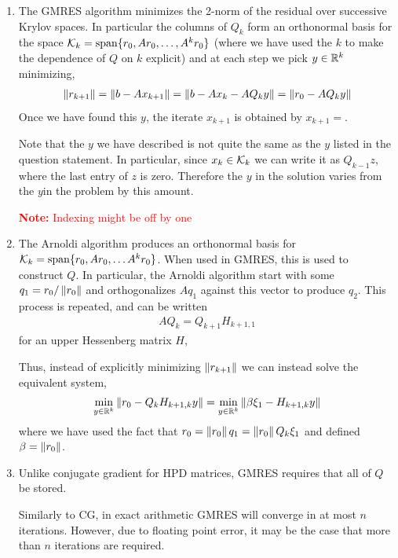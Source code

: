 \documentclass[10pt]{article}
\newcommand{\note}[1]{\textcolor{red}{\textbf{Note:} #1}}
\begin{document}
\begin{solution}[Solution]
\begin{enumerate}[]
\item The GMRES algorithm minimizes the 2-norm of the residual over successive Krylov spaces. In particular the columns of \( Q_k \) form an orthonormal basis for the space \( \mathcal{K}_k= \operatorname{span}\{r_0, Ar_0, \ldots, A^{k} r_0\} \) (where we have used the \( k \) to make the dependence of \( Q \) on \( k \) explicit) and at each step we pick \( y\in\mathbb{R}^k \) minimizing,
\begin{align*}
    \left\lVert r_{k+1}\right\rVert = \left\lVert b-Ax_{k+1}\right\rVert = \left\lVert b-Ax_k-AQ_ky\right\rVert = \left\lVert r_0-AQ_ky\right\rVert
\end{align*}
Once we have found this \( y \), the iterate \( x_{k+1} \) is obtained by \( x_{k+1} =  \).

Note that the \( y \) we have described is not quite the same as the \( y \) listed in the question statement. In particular, since \( x_{k}\in\mathcal{K}_k \) we can write it as \( Q_{k-1} z \), where the last entry of \( z \) is zero. Therefore the \( y \) in the solution varies from the \( y \)in the problem by this amount.

\note{Indexing might be off by one}

\item The Arnoldi algorithm produces an orthonormal basis for \( \mathcal{K}_k = \operatorname{span}\{r_0, Ar_0, \ldots A^k r_0\} \). When used in GMRES, this is used to construct \( Q \). In particular, the Arnoldi algorithm start with some \( q_1 = r_0 / \left\lVert r_0\right\rVert \) and orthogonalizes \( Aq_1 \) against this vector to produce \( q_2 \). This process is repeated, and can be written
\begin{align*}
    AQ_k = Q_{k+1}H_{k+1,1}
\end{align*}
for an upper Hessenberg matrix \( H \),

Thus, instead of explicitly minimizing \( \left\lVert r_{k+1}\right\rVert \) we can instead solve the equivalent system,
\begin{align*}
    \min_{y\in\mathbb{R}^k} \left\lVert r_0 - Q_kH_{k+1,k}y\right\rVert = \min_{y\in\mathbb{R}^k} \left\lVert\beta \xi_1 - H_{k+1,k}y\right\rVert
\end{align*}
where we have used the fact that \( r_0 = \left\lVert r_0\right\rVert q_1 = \left\lVert r_0\right\rVert Q_k \xi_1 \) and defined \( \beta = \left\lVert r_0\right\rVert \).

\item
Unlike conjugate gradient for HPD matrices, GMRES requires that all of \( Q \) be stored.

Similarly to CG, in exact arithmetic GMRES will converge in at most \( n \) iterations. However, due to floating point error, it may be the case that more than \( n \) iterations are required.


\end{enumerate}
\end{solution}
\end{document}

